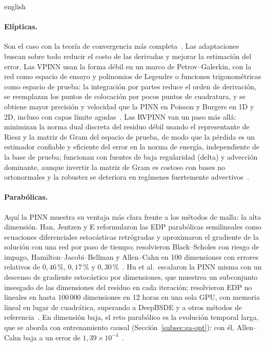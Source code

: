 \documentclass[0000.tex]{subfiles}
\begin{document}
\begin{hyphenrules}{english}
\paragraph{Elípticas.} Son el caso con la teoría de convergencia más completa~\cite{shin2020convergence,doumeche2025convergence}. Las adaptaciones buscan sobre todo reducir el costo de las derivadas y mejorar la estimación del error. Las VPINN usan la forma débil en un marco de Petrov--Galerkin, con la red como espacio de ensayo y polinomios de Legendre o funciones trigonométricas como espacio de prueba: la integración por partes reduce el orden de derivación, se reemplazan los puntos de colocación por pocos puntos de cuadratura, y se obtiene mayor precisión y velocidad que la PINN en Poisson y Burgers en 1D y 2D, incluso con capas límite agudas~\cite{kharazmi2019vpinns}. Las RVPINN van un paso más allá: minimizan la norma dual discreta del residuo débil usando el representante de Riesz y la matriz de Gram del espacio de prueba, de modo que la pérdida es un estimador confiable y eficiente del error en la norma de energía, independiente de la base de prueba; funcionan con fuentes de baja regularidad (delta) y advección dominante, aunque invertir la matriz de Gram es costoso con bases no ortonormales y la robustez se deteriora en regímenes fuertemente advectivos~\cite{rojas2024robust}.

\paragraph{Parabólicas.} Aquí la PINN muestra su ventaja más clara frente a los métodos de malla: la alta dimensión. Han, Jentzen y E reformularon las EDP parabólicas semilineales como ecuaciones diferenciales estocásticas retrógradas y aproximaron el gradiente de la solución con una red por paso de tiempo; resolvieron Black--Scholes con riesgo de impago, Hamilton--Jacobi--Bellman y Allen--Cahn en 100 dimensiones con errores relativos de $0{,}46\,\%$, $0{,}17\,\%$ y $0{,}30\,\%$~\cite{han2018solving}. Hu et al.\ escalaron la PINN misma con un descenso de gradiente estocástico por dimensiones, que muestrea un subconjunto insesgado de las dimensiones del residuo en cada iteración; resolvieron EDP no lineales en hasta $100\,000$ dimensiones en 12 horas en una sola GPU, con memoria lineal en lugar de cuadrática, superando a DeepBSDE y a otros métodos de referencia~\cite{hu2024tackling}. En dimensión baja, el reto parabólico es la evolución temporal larga, que se aborda con entrenamiento causal (Sección~\ref{subsec:ea-opt}): con él, Allen--Cahn baja a un error de $1{,}39\times10^{-4}$~\cite{wang2022respecting}.


\end{hyphenrules}
\end{document}
